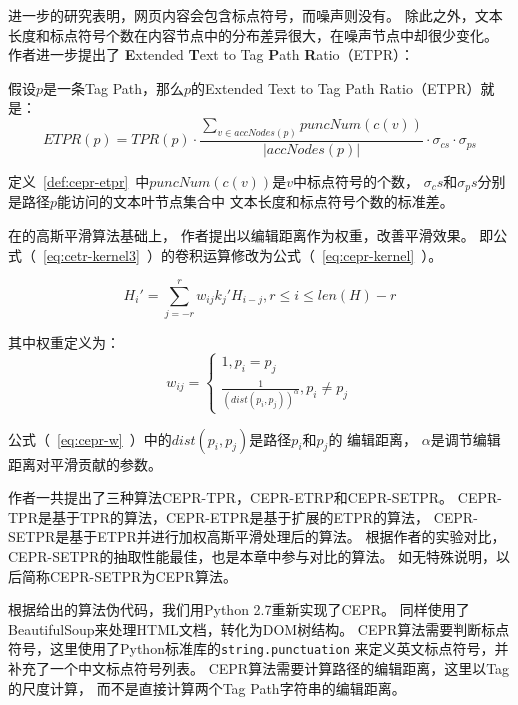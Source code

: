 进一步的研究表明，网页内容会包含标点符号，而噪声则没有。
除此之外，文本长度和标点符号个数在内容节点中的分布差异很大，在噪声节点中却很少变化。
作者进一步提出了
\textbf{E}xtended \textbf{T}ext to Tag \textbf{P}ath \textbf{R}atio（ETPR）：

\begin{definition}
\label{def:cepr-etpr}
假设$p$是一条Tag Path，那么$p$的Extended Text to Tag Path Ratio（ETPR）就是：
\begin{equation}
ETPR(p) = TPR(p) \cdot 
\frac{\sum_{v \in accNodes(p)}puncNum(c(v))}{\vert accNodes(p) \vert}
\cdot \sigma_{cs} \cdot \sigma_{ps}
\end{equation}
\end{definition}

定义~\ref{def:cepr-etpr}~中$puncNum(c(v))$是$v$中标点符号的个数，
$\sigma_cs$和$\sigma_ps$分别是路径$p$能访问的文本叶节点集合中
文本长度和标点符号个数的标准差。

在\cite{weninger2010cetr}的高斯平滑算法基础上，
作者提出以编辑距离作为权重，改善平滑效果。
即公式（~\ref{eq:cetr-kernel3}~）的卷积运算修改为公式（~\ref{eq:cepr-kernel}~）。

\begin{equation}
\label{eq:cepr-kernel}
H_i' = \sum_{j=-r}^{r} w_{ij} k_j' H_{i-j}, r \leq i \leq len(H)-r
\end{equation}

其中权重定义为：
\begin{equation}
\label{eq:cepr-w}
w_{ij} = 
\left\{\begin{matrix}
1, p_i = p_j \\ 
\frac{1}{(dist(p_i, p_j))^\alpha}, p_i \neq p_j
\end{matrix}\right.
\end{equation}

公式（~\ref{eq:cepr-w}~）中的$dist(p_i, p_j)$是路径$p_i$和$p_j$的
编辑距离，
$\alpha$是调节编辑距离对平滑贡献的参数。

作者一共提出了三种算法CEPR-TPR，CEPR-ETRP和CEPR-SETPR。
CEPR-TPR是基于TPR的算法，CEPR-ETPR是基于扩展的ETPR的算法，
CEPR-SETPR是基于ETPR并进行加权高斯平滑处理后的算法。
根据作者的实验对比，CEPR-SETPR的抽取性能最佳，也是本章中参与对比的算法。
如无特殊说明，以后简称CEPR-SETPR为CEPR算法。

根据\cite{wu2013web}给出的算法伪代码，我们用Python 2.7重新实现了CEPR。
同样使用了BeautifulSoup来处理HTML文档，转化为DOM树结构。
CEPR算法需要判断标点符号，这里使用了Python标准库的\texttt{string.punctuation}
来定义英文标点符号，并补充了一个中文标点符号列表。
CEPR算法需要计算路径的编辑距离，这里以Tag的尺度计算，
而不是直接计算两个Tag Path字符串的编辑距离。

